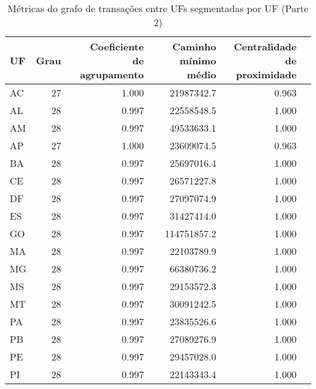 \begin{table}[htb]
\centering
\caption{Métricas do grafo de transações entre UFs segmentadas por UF (Parte 2)}
\label{tab:metricas-redes:grafo-por-uf-especificas2}
    \begin{tabular}{l|rrrrr}
    \toprule
    UF &  Grau &  \shortstack{Coeficiente\\de agrupamento} &  \shortstack{Caminho\\mínimo médio} &  \shortstack{Centralidade\\de proximidade} \\
    \midrule
    AC &      27 &      1.000 &          21987342.7 &                0.963 \\
    AL &      28 &      0.997 &          22558548.5 &                1.000 \\
    AM &      28 &      0.997 &          49533633.1 &                1.000 \\
    AP &      27 &      1.000 &          23609074.5 &                0.963 \\
    BA &      28 &      0.997 &          25697016.4 &                1.000 \\
    CE &      28 &      0.997 &          26571227.8 &                1.000 \\
    DF &      28 &      0.997 &          27097074.9 &                1.000 \\
    ES &      28 &      0.997 &          31427414.0 &                1.000 \\
    GO &      28 &      0.997 &         114751857.2 &                1.000 \\
    MA &      28 &      0.997 &          22103789.9 &                1.000 \\
    MG &      28 &      0.997 &          66380736.2 &                1.000 \\
    MS &      28 &      0.997 &          29153572.3 &                1.000 \\
    MT &      28 &      0.997 &          30091242.5 &                1.000 \\
    PA &      28 &      0.997 &          23835526.6 &                1.000 \\
    PB &      28 &      0.997 &          27089276.9 &                1.000 \\
    PE &      28 &      0.997 &          29457028.0 &                1.000 \\
    PI &      28 &      0.997 &          22143343.4 &                1.000 \\

\end{tabular}
\end{table}
